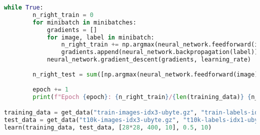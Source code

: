 \documentclass{article}
\theoremstyle{definition}
\theoremstyle{remark}
\theoremstyle{example}
\begin{document}
\begin{lstlisting}[language=Python, basicstyle=\scriptsize]
	while True:
		n_right_train = 0
		for minibatch in minibatches:
			gradients = []
			for image, label in minibatch:
				n_right_train += np.argmax(neural_network.feedforward(image))==np.argmax(label)
				gradients.append(neural_network.backpropagation(label))
			neural_network.gradient_descent(gradients, learning_rate)
		
		n_right_test = sum([np.argmax(neural_network.feedforward(image))==np.argmax(label) for image, label in test_data])
		
		epoch += 1
		print(f"Epoch {epoch}: {n_right_train}/{len(training_data)} {n_right_test}/{len(test_data)}")

training_data = get_data("train-images-idx3-ubyte.gz", "train-labels-idx1-ubyte.gz", 60000)
test_data = get_data("t10k-images-idx3-ubyte.gz", "t10k-labels-idx1-ubyte.gz", 10000)
learn(training_data, test_data, [28*28, 400, 10], 0.5, 10)
\end{lstlisting}
\end{document}
